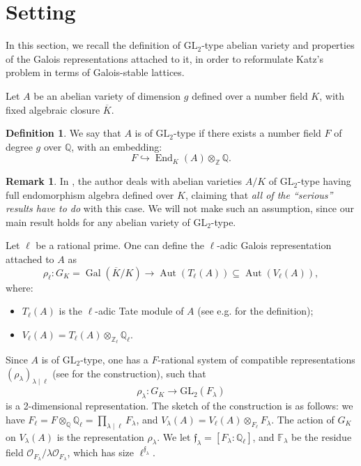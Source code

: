 \documentclass[a4paper,11pt]{amsart}
\theoremstyle{definition}
\newtheorem{definition}{Definition}[section]
\newtheorem{remark}[theorem]{Remark}
\newcommand{\Q}{\mathbb Q}
\newcommand{\Z}{\mathbb Z}
\newcommand{\f}{\mathfrak{f}}
\newcommand{\GL}{\text{GL}}
\DeclareMathOperator{\Gal}{Gal}
\DeclareMathOperator{\Aut}{Aut}
\DeclareMathOperator{\End}{End}
\renewcommand{\bar}{\overline}
\begin{document}
\section{Setting}\label{sec:setting}
In this section, we recall the definition of \(\GL_2\)-type abelian variety and properties of the Galois representations attached to it, in order to reformulate Katz's problem in terms of Galois-stable lattices.

Let \(A\) be an abelian variety of dimension \(g\) defined over a number field \(K\), with fixed algebraic closure \(\bar{K}\). 
\begin{definition}\label{def:GL2}
    We say that \(A\) is of \(\GL_2\)-type if there exists a number field \(F\) of degree \(g\) over \(\Q\), with an embedding:
    \[
    F \hookrightarrow \End_K(A) \otimes_\Z \Q.
    \]
\end{definition}


\begin{remark}
    In \cite{Ribet1976GaloisMultiplications}, the author deals with abelian varieties \(A/K\) of \(\GL_2\)-type having full endomorphism algebra defined over \(K\), claiming that \emph{all of the ``serious'' results have to do} with this case. We will not make such an assumption, since our main result holds for any abelian variety of \(\GL_2\)-type.
\end{remark}

Let \(\ell\) be a rational prime. One can define the \(\ell\)-adic Galois representation attached to \(A\) as
\[
\rho_\ell : G_K = \Gal(\overline{K}/K) \rightarrow \Aut(T_\ell(A)) \subseteq \Aut(V_\ell(A)),
\]
where:
\begin{itemize}
    \item \(T_\ell(A)\) is the \(\ell\)-adic Tate module of \(A\) (see e.g. \cite{Serre1968GoodVarieties} for the definition);
    \item \(V_\ell(A)= T_\ell(A) \otimes_{\Z_\ell} \Q_\ell\).
\end{itemize}

Since \(A\) is of \(\GL_2\)-type, one has a \(F\)-rational system of compatible representations \((\rho_\lambda)_{\lambda \mid \ell}\) (see \cite{Ribet1976GaloisMultiplications, Lombardo2016ExplicitGL2-varieties, Azon2024ConductorCurves} for the construction), such that $$\rho_\lambda : G_K \rightarrow \GL_2(F_\lambda)$$ is a 2-dimensional representation. The sketch of the construction is as follows: we have \(F_\ell = F \otimes_\Q \Q_\ell = \prod_{\lambda \mid \ell} F_\lambda\), and \(V_\lambda (A) = V_\ell (A) \otimes_{F_\ell} F_\lambda\). The action of \(G_K\) on \(V_\lambda (A)\) is the representation \(\rho_\lambda\). We let \(\f_\lambda =[F_\lambda : \Q_\ell]\), and \(\mathbb{F}_\lambda\) be the residue field \(\mathcal{O}_{F_\lambda} / \lambda \mathcal{O}_{F_\lambda}\), which has size \(\ell^{\f_\lambda}\).
\end{document}
